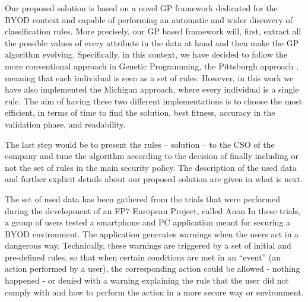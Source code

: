 \documentclass[runningheads]{llncs}
\begin{document}
Our proposed solution is based on a novel GP framework dedicated for
the BYOD context and capable of performing an automatic and wider discovery of classification rules. More precisely, our GP based framework will, first, extract all the possible values of every attribute in the data at hand and then make the GP algorithm evolving. 
Specifically, in this context, we have decided to follow the more
conventional approach in Genetic Programming, the Pittsburgh approach
\cite{freitas2002data}, meaning that each individual is seen as a set
of rules. However, in this work we have also implemented the Michigan
approach, where every individual is a single rule. The aim of having these two different implementations is to choose the most efficient, in terms of time to find the solution, best fitness, accuracy in the validation phase, and readability.

The last step would be to present the rules -- solution -- to the CSO of the company and tune the algorithm according to the decision of
finally including or not the set of rules in the main security
policy. The description of the used data and further explicit details
about our proposed solution are given in what is next.

\label{subsec:data}

 The set of used data has been gathered from the trials that were performed
during the development of an FP7 European Project, called Anon
In these trials, a group of
 users tested a smartphone and PC application meant for securing a
 BYOD environment. The application generates warnings when the users
 act in a dangerous way. Technically, these warnings are triggered by
 a set of initial and pre-defined rules, so that when certain
 conditions are met in an ``event'' (an action performed by a user),
 the corresponding action could be allowed - nothing happened - or
 denied with a warning explaining the rule that the user did not comply with and how to perform the action in a more secure way or environment.
\end{document}
